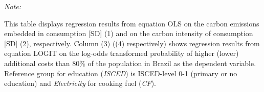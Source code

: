 \begin{table}[htbp!]
\begin{adjustbox}{width = 1\textwidth, max height = 0.95\textheight, center}
\begin{threeparttable}[b]
         \begin{tablenotes}\item \medskip \textit{Note:}
            \item This table displays regression results from equation OLS on the carbon emissions embedded in consumption [SD] (1) and on the carbon intensity of consumption [SD] (2), respectively. 
                                      Column (3) ((4) respectively) shows regression results from equation LOGIT on the log-odds transformed probability of higher (lower) additional costs than 80\% of the population in Brazil as the dependent variable. Reference group for education (\textit{ISCED}) is ISCED-level 0-1 (primary or no education) and \textit{Electricity} for cooking fuel (\textit{CF}).
         \end{tablenotes}
      \end{threeparttable}
   \end{adjustbox}
\end{table}


